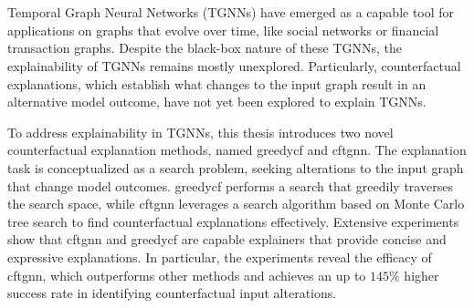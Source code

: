 \thispagestyle{empty}\section*{}

Temporal Graph Neural Networks (TGNNs) have emerged as a capable tool for applications on graphs that evolve over time, like social networks or financial transaction graphs. Despite the black-box nature of these TGNNs, the explainability of TGNNs remains mostly unexplored. Particularly, counterfactual explanations, which establish what changes to the input graph result in an alternative model outcome, have not yet been explored to explain TGNNs.

To address explainability in TGNNs, this thesis introduces two novel counterfactual explanation methods, named \acrfull{greedycf} and \acrfull{cftgnn}. The explanation task is conceptualized as a search problem, seeking alterations to the input graph that change model outcomes.
\acrshort{greedycf} performs a search that greedily traverses the search space, while \acrshort{cftgnn} leverages a search algorithm based on Monte Carlo tree search to find counterfactual explanations effectively. Extensive experiments show that \acrshort{cftgnn} and \acrshort{greedycf} are capable explainers that provide concise and expressive explanations. In particular, the experiments reveal the efficacy of \acrshort{cftgnn}, which outperforms other methods and achieves an up to $145\%$ higher success rate in identifying counterfactual input alterations.








